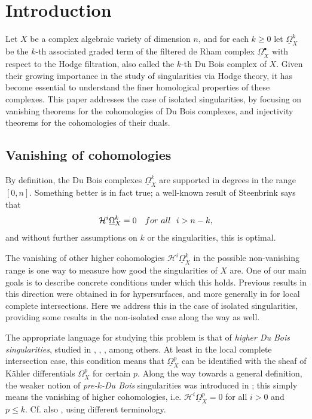 \documentclass[11pt]{amsart}
\theoremstyle{definition}
\theoremstyle{plain}
\renewcommand{\H}{\mathcal H}
\newcommand{\DB}{\underline{\Omega}} %
\newcounter{intro}
\begin{document}



\section{Introduction}
Let $X$ be a complex algebraic variety of dimension $n$, and for each $k \ge 0$ let $\DB_X^k$ be the $k$-th associated graded term of the filtered de Rham complex $\DB_X^\bullet$ with respect to the Hodge filtration, also called the $k$-th Du Bois complex of $X$. Given their growing importance in the study of singularities via Hodge theory, it has become essential to understand the finer homological properties of these complexes. This paper addresses the case of isolated singularities, by focusing on vanishing theorems for the cohomologies of Du Bois complexes, and injectivity theorems for the cohomologies of their duals.



\subsection*{Vanishing of cohomologies}
By definition, the Du Bois complexes $\DB_X^k$ are supported in degrees in the range $[0, n]$. Something better is in fact true; 
a well-known result of Steenbrink \cite[(4.1)]{Steenbrink-vanishing} says that
\[\H^i\DB_X^k=0 \,\,\,\,\,\,{\rm for ~all}\,\,\,\, i> n -k,\]
and without further assumptions on $k$ or the singularities, this is optimal. 

The vanishing of other higher cohomologies $\H^i\DB_X^k$ in the possible non-vanishing range is one way to measure how good the singularities of $X$ are. One of our main goals is to describe concrete conditions under which this holds. Previous results in this direction were obtained in \cite{MOPW} for hypersurfaces, and more generally in \cite{MP-LC} for local complete intersections. Here we address this in the case of isolated singularities, providing some results in the non-isolated case along the way as well.

The appropriate language for studying this problem is that of \emph{higher Du Bois singularities}, studied in \cite{MOPW}, \cite{JKSY}, 
\cite{MP-LC}, \cite{SVV} among others. At least in the local complete intersection case, this condition means that $\DB_X^p$ can be identified with 
the sheaf of K\"ahler differentials $\Omega_X^p$ for certain $p$. Along the way towards a general definition, the weaker notion of \emph{pre-$k$-Du Bois} singularities was introduced in \cite{SVV}; this simply means the vanishing of higher cohomologies, i.e. $\H^i \DB_X^p = 0$ for all $i >0$ and $p \le k$.
Cf. also \cite{Tighe}, using different terminology.
\end{document}

